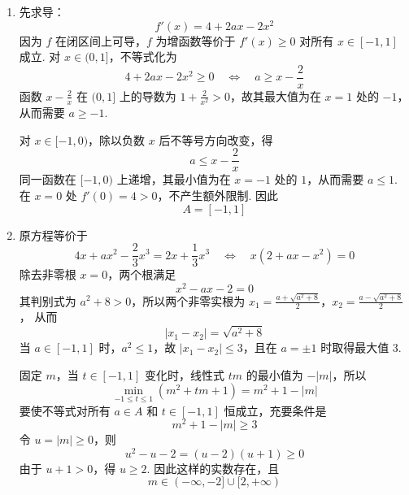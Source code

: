 \begin{solution}
\begin{enumerate}
\item 先求导：
\[
f'(x)=4+2ax-2x^2
\]
因为 \(f\) 在闭区间上可导，\(f\) 为增函数等价于 \(f'(x)\geq0\) 对所有 \(x\in[-1,1]\) 成立. 对 \(x\in(0,1]\)，不等式化为
\[
4+2ax-2x^2\geq0
\quad\Longleftrightarrow\quad
a\geq x-\frac2x
\]
函数 \(x-\frac2x\) 在 \((0,1]\) 上的导数为 \(1+\frac2{x^2}>0\)，故其最大值为在 \(x=1\) 处的 \(-1\)，从而需要 \(a\geq-1\).

对 \(x\in[-1,0)\)，除以负数 \(x\) 后不等号方向改变，得
\[
a\leq x-\frac2x
\]
同一函数在 \([-1,0)\) 上递增，其最小值为在 \(x=-1\) 处的 \(1\)，从而需要 \(a\leq1\). 在 \(x=0\) 处 \(f'(0)=4>0\)，不产生额外限制. 因此
\[
A=[-1,1]
\]
\item 原方程等价于
\[
4x+ax^2-\frac23x^3=2x+\frac13x^3
\quad\Longleftrightarrow\quad
x(2+ax-x^2)=0
\]
除去非零根 \(x=0\)，两个根满足
\[
x^2-ax-2=0
\]
其判别式为 \(a^2+8>0\)，所以两个非零实根为
\(x_1=\frac{a+\sqrt{a^2+8}}2\)，\(x_2=\frac{a-\sqrt{a^2+8}}2\)，
从而
\[
|x_1-x_2|=\sqrt{a^2+8}
\]
当 \(a\in[-1,1]\) 时，\(a^2\leq1\)，故 \(|x_1-x_2|\leq3\)，且在 \(a=\pm1\) 时取得最大值 \(3\).

固定 \(m\)，当 \(t\in[-1,1]\) 变化时，线性式 \(tm\) 的最小值为 \(-|m|\)，所以
\[
\min_{-1\leq t\leq1}(m^2+tm+1)=m^2+1-|m|
\]
要使不等式对所有 \(a\in A\) 和 \(t\in[-1,1]\) 恒成立，充要条件是
\[
m^2+1-|m|\geq3
\]
令 \(u=|m|\geq0\)，则
\[
u^2-u-2=(u-2)(u+1)\geq0
\]
由于 \(u+1>0\)，得 \(u\geq2\). 因此这样的实数存在，且
\[
m\in(-\infty,-2]\cup[2,+\infty)
\]
\end{enumerate}
\end{solution}
